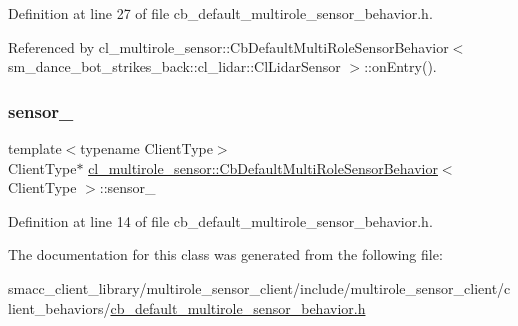 Definition at line 27 of file cb\+\_\+default\+\_\+multirole\+\_\+sensor\+\_\+behavior.\+h.



Referenced by cl\+\_\+multirole\+\_\+sensor\+::\+Cb\+Default\+Multi\+Role\+Sensor\+Behavior$<$ sm\+\_\+dance\+\_\+bot\+\_\+strikes\+\_\+back\+::cl\+\_\+lidar\+::\+Cl\+Lidar\+Sensor $>$\+::on\+Entry().

\mbox{\label{classcl__multirole__sensor_1_1CbDefaultMultiRoleSensorBehavior_a201893c3c859259eac3166405f3509cb}} 
\subsubsection{\texorpdfstring{sensor\+\_\+}{sensor\_}}
{\footnotesize\ttfamily template$<$typename Client\+Type$>$ \\
Client\+Type$\ast$ \hyperlink{classcl__multirole__sensor_1_1CbDefaultMultiRoleSensorBehavior}{cl\+\_\+multirole\+\_\+sensor\+::\+Cb\+Default\+Multi\+Role\+Sensor\+Behavior}$<$ Client\+Type $>$\+::sensor\+\_\+}



Definition at line 14 of file cb\+\_\+default\+\_\+multirole\+\_\+sensor\+\_\+behavior.\+h.



The documentation for this class was generated from the following file\+:\begin{DoxyCompactItemize}
\item 
smacc\+\_\+client\+\_\+library/multirole\+\_\+sensor\+\_\+client/include/multirole\+\_\+sensor\+\_\+client/client\+\_\+behaviors/\hyperlink{cb__default__multirole__sensor__behavior_8h}{cb\+\_\+default\+\_\+multirole\+\_\+sensor\+\_\+behavior.\+h}\end{DoxyCompactItemize}
